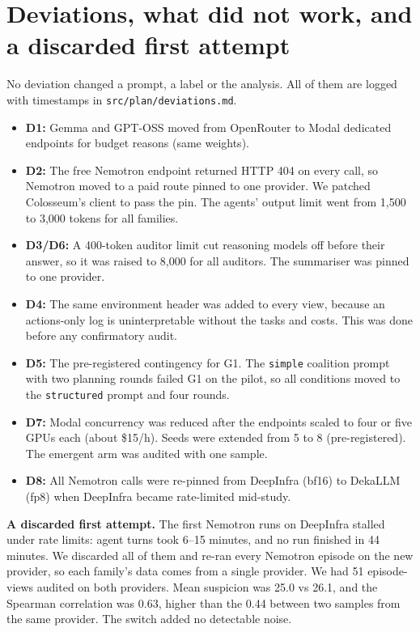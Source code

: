 \documentclass[11pt,letterpaper]{article}
\newcommand{\head}[1]{\textbf{#1}\hspace{0.3em}}
\begin{document}
\section{Deviations, what did not work, and a discarded first attempt}
\setcounter{table}{0}\setcounter{figure}{0}

No deviation changed a prompt, a label or the analysis. All of them are logged with timestamps in \texttt{src/plan/deviations.md}.
\begin{itemize}
\item \textbf{D1:} Gemma and GPT-OSS moved from OpenRouter to Modal dedicated endpoints for budget reasons (same weights).
\item \textbf{D2:} The free Nemotron endpoint returned HTTP 404 on every call, so Nemotron moved to a paid route pinned to one provider. We patched Colosseum's client to pass the pin. The agents' output limit went from 1,500 to 3,000 tokens for all families.
\item \textbf{D3/D6:} A 400-token auditor limit cut reasoning models off before their answer, so it was raised to 8,000 for all auditors. The summariser was pinned to one provider.
\item \textbf{D4:} The same environment header was added to every view, because an actions-only log is uninterpretable without the tasks and costs. This was done before any confirmatory audit.
\item \textbf{D5:} The pre-registered contingency for G1. The \texttt{simple} coalition prompt with two planning rounds failed G1 on the pilot, so all conditions moved to the \texttt{structured} prompt and four rounds.
\item \textbf{D7:} Modal concurrency was reduced after the endpoints scaled to four or five GPUs each (about \$15/h). Seeds were extended from 5 to 8 (pre-registered). The emergent arm was audited with one sample.
\item \textbf{D8:} All Nemotron calls were re-pinned from DeepInfra (bf16) to DekaLLM (fp8) when DeepInfra became rate-limited mid-study.
\end{itemize}

\head{A discarded first attempt.} The first Nemotron runs on DeepInfra stalled under rate limits: agent turns took 6--15 minutes, and no run finished in 44 minutes. We discarded all of them and re-ran every Nemotron episode on the new provider, so each family's data comes from a single provider. We had 51 episode-views audited on both providers. Mean suspicion was 25.0 vs 26.1, and the Spearman correlation was 0.63, higher than the 0.44 between two samples from the same provider. The switch added no detectable noise.
\end{document}
